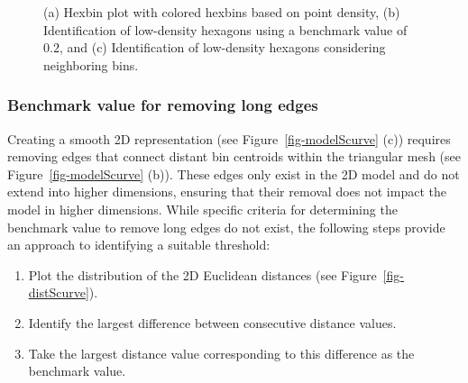 \documentclass[
  12pt]{article}
\providecommand{\tightlist}{%
  \setlength{\itemsep}{0pt}\setlength{\parskip}{0pt}}\usepackage{longtable,booktabs,array}
\begin{document}
\begin{figure}[H]


\caption{\label{fig-rmlowdenshex}(a) Hexbin plot with colored hexbins
based on point density, (b) Identification of low-density hexagons using
a benchmark value of \(0.2\), and (c) Identification of low-density
hexagons considering neighboring bins.}

\end{figure}%

\subsubsection{Benchmark value for removing long
edges}\label{benchmark-value-for-removing-long-edges}

Creating a smooth 2D representation (see Figure~\ref{fig-modelScurve}
(c)) requires removing edges that connect distant bin centroids within
the triangular mesh (see Figure~\ref{fig-modelScurve} (b)). These edges
only exist in the 2D model and do not extend into higher dimensions,
ensuring that their removal does not impact the model in higher
dimensions. While specific criteria for determining the benchmark value
to remove long edges do not exist, the following steps provide an
approach to identifying a suitable threshold:

\begin{enumerate}
\def\labelenumi{\arabic{enumi}.}
\tightlist
\item
  Plot the distribution of the 2D Euclidean distances (see
  Figure~\ref{fig-distScurve}).
\item
  Identify the largest difference between consecutive distance values.
\item
  Take the largest distance value corresponding to this difference as
  the benchmark value.
\end{enumerate}
\end{document}
